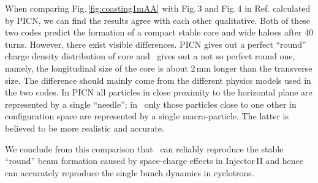 \documentclass[aps,prstab,twocolumn,superscriptaddress,showpacs]{revtex4}
\begin{document}
When comparing Fig.\,\ref{fig:coasting1mAA} with Fig.\,3 and Fig.\,4 in Ref.  calculated by PICN, we can find the results agree with each 
other qualitative. Both of these two codes predict the formation of a compact stable core and  wide haloes after 40 turns.
However, there exist visible differences. PICN gives out a perfect ``round'' charge density distribution of core and \opalcycl\ gives out a not so perfect round one, namely, the longitudinal size of the core is about 2\,mm longer than the transverse size. The difference should mainly come from the different physics models used in the two codes.
In PICN all particles in close proximity to the horizontal plane are represented by a single ``needle''; in \opalcycl\  only those particles close to one other in configuration space are represented by a single macro-particle. The
latter is believed to be more realistic and accurate. 

We conclude from this comparison that \opalcycl\ can reliably reproduce the stable ``round'' beam formation caused by space-charge effects in Injector\,II and hence can accurately  reproduce the single bunch dynamics in cyclotrons.
\end{document}
